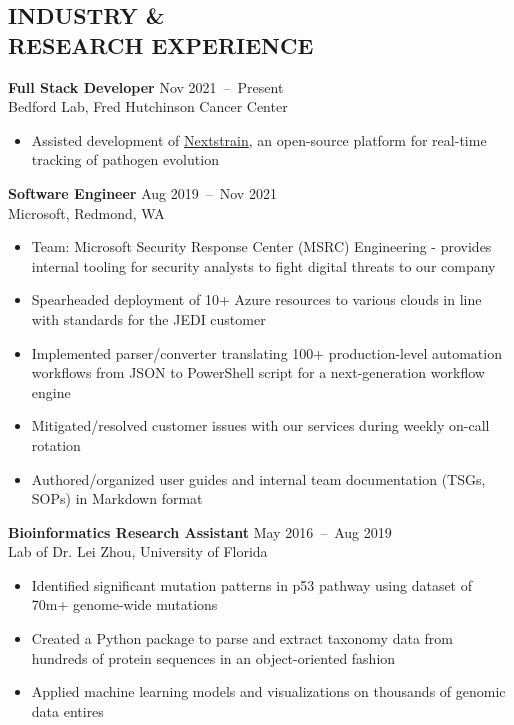 \documentclass[line,resmargin]{res}
\begin{document}
\address{\href{mailto:victor@victorl.in}{victor@victorl.in} $|$
         \href{https://victorl.in/}{https://victorl.in/}}

\begin{resume}

\section{INDUSTRY \& \\ RESEARCH EXPERIENCE}
    \textbf{Full Stack Developer}    \hfill Nov 2021~--~Present \\
    Bedford Lab, Fred Hutchinson Cancer Center
    \begin{itemize}  \itemsep -2pt
        \item Assisted development of \href{https://nextstrain.org/}{Nextstrain}, an open-source platform for real-time tracking of pathogen evolution
    \end{itemize}

    \textbf{Software Engineer}    \hfill Aug 2019~--~Nov 2021 \\
    Microsoft, Redmond, WA
    \begin{itemize}  \itemsep -2pt
        \item Team: Microsoft Security Response Center (MSRC) Engineering - provides internal tooling for security analysts to fight digital threats to our company
        \item Spearheaded deployment of 10+ Azure resources to various clouds in line with standards for the JEDI customer
        \item Implemented parser/converter translating 100+ production-level automation workflows from JSON to PowerShell script for a next-generation workflow engine
        \item Mitigated/resolved customer issues with our services during weekly on-call rotation
        \item Authored/organized user guides and internal team documentation (TSGs, SOPs) in Markdown format
    \end{itemize}

    \textbf{Bioinformatics Research Assistant}    \hfill May 2016~--~Aug 2019 \\
    Lab of Dr. Lei Zhou, University of Florida
    \begin{itemize}  \itemsep -2pt
        \item Identified significant mutation patterns in p53 pathway using dataset of 70m+ genome-wide mutations
        \item Created a Python package to parse and extract taxonomy data from hundreds of protein sequences in an object-oriented fashion
        \item Applied machine learning models and visualizations on thousands of genomic data entires
    \end{itemize}


\end{resume}
\end{document}
